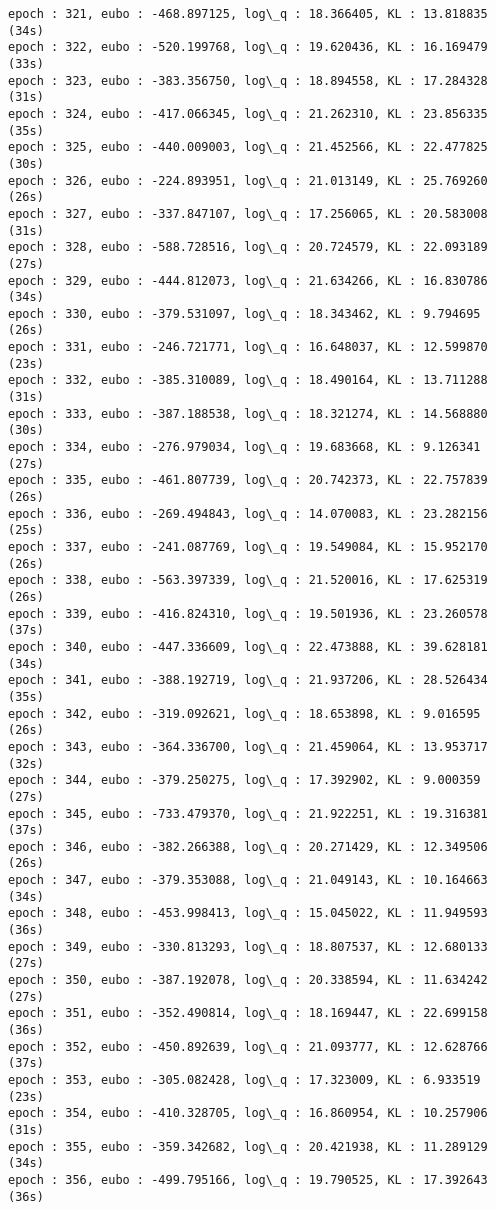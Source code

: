 \documentclass[11pt]{article}
\begin{document}
\begin{Verbatim}[commandchars=\\\{\}]
epoch : 321, eubo : -468.897125, log\_q : 18.366405, KL : 13.818835 (34s)
epoch : 322, eubo : -520.199768, log\_q : 19.620436, KL : 16.169479 (33s)
epoch : 323, eubo : -383.356750, log\_q : 18.894558, KL : 17.284328 (31s)
epoch : 324, eubo : -417.066345, log\_q : 21.262310, KL : 23.856335 (35s)
epoch : 325, eubo : -440.009003, log\_q : 21.452566, KL : 22.477825 (30s)
epoch : 326, eubo : -224.893951, log\_q : 21.013149, KL : 25.769260 (26s)
epoch : 327, eubo : -337.847107, log\_q : 17.256065, KL : 20.583008 (31s)
epoch : 328, eubo : -588.728516, log\_q : 20.724579, KL : 22.093189 (27s)
epoch : 329, eubo : -444.812073, log\_q : 21.634266, KL : 16.830786 (34s)
epoch : 330, eubo : -379.531097, log\_q : 18.343462, KL : 9.794695 (26s)
epoch : 331, eubo : -246.721771, log\_q : 16.648037, KL : 12.599870 (23s)
epoch : 332, eubo : -385.310089, log\_q : 18.490164, KL : 13.711288 (31s)
epoch : 333, eubo : -387.188538, log\_q : 18.321274, KL : 14.568880 (30s)
epoch : 334, eubo : -276.979034, log\_q : 19.683668, KL : 9.126341 (27s)
epoch : 335, eubo : -461.807739, log\_q : 20.742373, KL : 22.757839 (26s)
epoch : 336, eubo : -269.494843, log\_q : 14.070083, KL : 23.282156 (25s)
epoch : 337, eubo : -241.087769, log\_q : 19.549084, KL : 15.952170 (26s)
epoch : 338, eubo : -563.397339, log\_q : 21.520016, KL : 17.625319 (26s)
epoch : 339, eubo : -416.824310, log\_q : 19.501936, KL : 23.260578 (37s)
epoch : 340, eubo : -447.336609, log\_q : 22.473888, KL : 39.628181 (34s)
epoch : 341, eubo : -388.192719, log\_q : 21.937206, KL : 28.526434 (35s)
epoch : 342, eubo : -319.092621, log\_q : 18.653898, KL : 9.016595 (26s)
epoch : 343, eubo : -364.336700, log\_q : 21.459064, KL : 13.953717 (32s)
epoch : 344, eubo : -379.250275, log\_q : 17.392902, KL : 9.000359 (27s)
epoch : 345, eubo : -733.479370, log\_q : 21.922251, KL : 19.316381 (37s)
epoch : 346, eubo : -382.266388, log\_q : 20.271429, KL : 12.349506 (26s)
epoch : 347, eubo : -379.353088, log\_q : 21.049143, KL : 10.164663 (34s)
epoch : 348, eubo : -453.998413, log\_q : 15.045022, KL : 11.949593 (36s)
epoch : 349, eubo : -330.813293, log\_q : 18.807537, KL : 12.680133 (27s)
epoch : 350, eubo : -387.192078, log\_q : 20.338594, KL : 11.634242 (27s)
epoch : 351, eubo : -352.490814, log\_q : 18.169447, KL : 22.699158 (36s)
epoch : 352, eubo : -450.892639, log\_q : 21.093777, KL : 12.628766 (37s)
epoch : 353, eubo : -305.082428, log\_q : 17.323009, KL : 6.933519 (23s)
epoch : 354, eubo : -410.328705, log\_q : 16.860954, KL : 10.257906 (31s)
epoch : 355, eubo : -359.342682, log\_q : 20.421938, KL : 11.289129 (34s)
epoch : 356, eubo : -499.795166, log\_q : 19.790525, KL : 17.392643 (36s)

\end{Verbatim}
\end{document}
